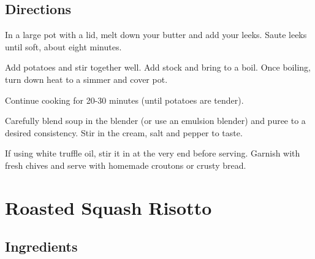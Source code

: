 \documentclass[ansiapaper,10pt,english]{sphinxmanual}
\begin{document}
\section{Directions}
\label{\detokenize{Potato_Leek_Soup:directions}}
In a large pot with a lid, melt down your butter and add your leeks. Saute leeks until soft, about eight minutes.

Add potatoes and stir together well. Add stock and bring to a boil. Once boiling, turn down heat to a simmer and cover pot.

Continue cooking for 20-30 minutes (until potatoes are tender).

Carefully blend soup in the blender (or use an emulsion blender) and puree to a desired consistency. Stir in the cream, salt and pepper to taste.

If using white truffle oil, stir it in at the very end before serving. Garnish with fresh chives and serve with homemade croutons or crusty bread.


\chapter{Roasted Squash Risotto}
\label{\detokenize{RSRisotto:roasted-squash-risotto}}\label{\detokenize{RSRisotto::doc}}


\section{Ingredients}
\label{\detokenize{RSRisotto:ingredients}}
%
\begin{sphinxVerbatim}[commandchars=\\\{\}]
     

   

   

   

         

   

   

   

    

   

       

   
\end{sphinxVerbatim}
\end{document}
